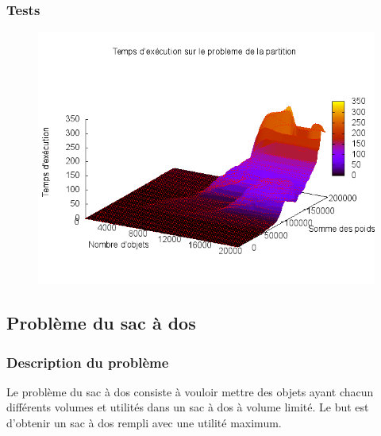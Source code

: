 \subsubsection{Tests}

\begin{figure}[H]
	\includegraphics[width=\linewidth]{../pratique/prog_dynamique_dev/res/partition.png}
\end{figure}


\subsection{Problème du sac à dos}

\subsubsection{Description du problème}
Le problème du sac à dos consiste à vouloir mettre des objets ayant chacun différents volumes et utilités dans un sac à dos à volume limité. Le but est d'obtenir un sac à dos rempli avec une utilité maximum.

